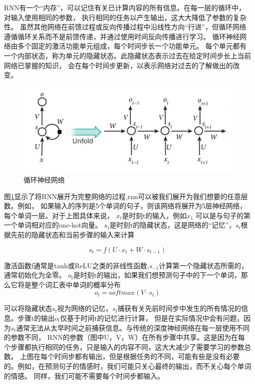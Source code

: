 RNN有一个“内存”，可以记住有关已计算内容的所有信息。在每一层的循环中，对输入使用相同的参数，
执行相同的任务以产生输出，这大大降低了参数的复杂性。
虽然其他网络在前馈过程或反向传播过程中沿线性方向“行进”，但循环网络遵循循环关系而不是前馈传递，并通过使用时间反向传播进行学习。
循环神经网络由多个固定的激活功能单元组成，每个时间步长一个功能单元。
每个单元都有一个内部状态，称为单元的隐藏状态。此隐藏状态表示过去在给定时间步长上当前网络已掌握的知识，
会在每个时间步更新，以表示网络对过去的了解做出的改变。

\begin{figure}[htbp]
  \centering
  \includegraphics[scale=0.5]{./images/rnn.jpg}
  \caption{循环神经网络}
  \label{fig:rnn}
\end{figure}

图\ref{fig:rnn}显示了将RNN展开为完整网络的过程,rnn可以被我们展开为我们想要的任意层数。例如，
如果输入的序列是5个单词的句子，则该网络将展开为5层神经网络，每个单词一层。对于上图具体来说，
$x_{t}$是时刻t的输入，例如$x_{1}$ 可以是与句子的第一个单词相对应的one-hot向量。
$s_{t}$是时刻t的隐藏状态，这是网络的“记忆”，$s_{t}$根据先前的隐藏状态和当前步骤的输入来计算

\begin{equation}
  s_{t}=f(U \cdot x_{t}+W \cdot s_{t-1})
  \end{equation}

激活函数f通常是tanh或ReLU之类的非线性函数,$s_{-1}$计算第一个隐藏状态所需的，通常初始化为全零。
$o_{t}$是时刻t的输出，如果我们想预测句子中的下一个单词，那么它将是整个词汇表中单词的概率分布
\begin{equation}
  o_t = \mathrm softmax (V \cdot s_t)
  \end{equation}

  可以将隐藏状态$s_{t}$视为网络的记忆，$s_{t}$捕获有关先前时间步中发生的所有情况的信息。步骤t的输出$o_{t}$仅基于时间t的记忆进行计算，
  但是在实际情况中会有问题，因为$s_{t}$通常无法从太早时间之前捕获信息。与传统的深度神经网络在每一层使用不同的参数不同，
  RNN的参数（图中U，V，W）在所有步骤中共享。这是因为在每个步骤都执行相同的任务，只是输入的内容不同，这大大减少了需要学习的参数总数。
  上图在每个时间步都有输出，但是根据任务的不同，可能有些是没有必要的。例如，在预测句子的情感时，我们可能只关心最终的输出，而不关心每个单词的情感。
  同样，我们可能不需要每个时间步都输入。

